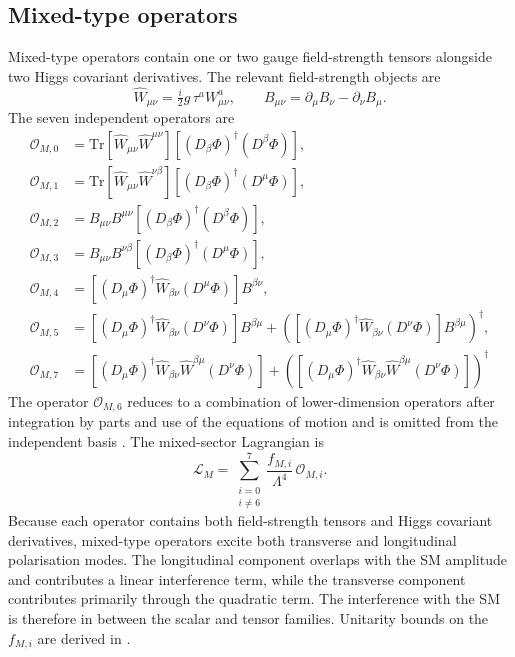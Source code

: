 \subsection{Mixed-type operators}

Mixed-type operators contain one or two gauge field-strength tensors alongside two Higgs covariant derivatives. The relevant field-strength objects are
\begin{equation}
\hat{W}_{\mu\nu} = \tfrac{i}{2}g\,\tau^{a}W_{\mu\nu}^{a}, \qquad B_{\mu\nu} = \partial_{\mu}B_{\nu}-\partial_{\nu}B_{\mu}.
\end{equation}
The seven independent operators are \cite{Eboli_2016}
\begin{align}
\mathcal{O}_{M,0} &= \mathrm{Tr}\!\left[\hat{W}_{\mu\nu}\hat{W}^{\mu\nu}\right] \left[(D_{\beta}\Phi)^{\dagger}(D^{\beta}\Phi)\right], \\[3pt] \mathcal{O}_{M,1} &= \mathrm{Tr}\!\left[\hat{W}_{\mu\nu}\hat{W}^{\nu\beta}\right] \left[(D_{\beta}\Phi)^{\dagger}(D^{\mu}\Phi)\right], \\[3pt] \mathcal{O}_{M,2} &= B_{\mu\nu}B^{\mu\nu} \left[(D_{\beta}\Phi)^{\dagger}(D^{\beta}\Phi)\right], \\[3pt] \mathcal{O}_{M,3} &= B_{\mu\nu}B^{\nu\beta} \left[(D_{\beta}\Phi)^{\dagger}(D^{\mu}\Phi)\right], \\[3pt] \mathcal{O}_{M,4} &= \left[(D_{\mu}\Phi)^{\dagger}\hat{W}_{\beta\nu}(D^{\mu}\Phi)\right]B^{\beta\nu}, \\[3pt] \mathcal{O}_{M,5} &= \left[(D_{\mu}\Phi)^{\dagger}\hat{W}_{\beta\nu}(D^{\nu}\Phi)\right]B^{\beta\mu} + \left(\left[(D_{\mu}\Phi)^{\dagger}\hat{W}_{\beta\nu}(D^{\nu}\Phi)\right]B^{\beta\mu}\right)^{\dagger}, \\[3pt] \mathcal{O}_{M,7} &= \left[(D_{\mu}\Phi)^{\dagger}\hat{W}_{\beta\nu}\hat{W}^{\beta\mu}(D^{\nu}\Phi)\right] + \left(\left[(D_{\mu}\Phi)^{\dagger}\hat{W}_{\beta\nu}\hat{W}^{\beta\mu}(D^{\nu}\Phi)\right]\right)^{\dagger}
\end{align}
The operator $\mathcal{O}_{M,6}$ reduces to a combination of lower-dimension operators after integration by parts and use of the equations of motion and is omitted from the independent basis \cite{Eboli_2016}. The mixed-sector Lagrangian is
\begin{equation}
\mathcal{L}_{M} = \sum_{\substack{i=0\\i\neq 6}}^{7} \frac{f_{M,i}}{\Lambda^{4}}\,\mathcal{O}_{M,i}.
\end{equation}
Because each operator contains both field-strength tensors and Higgs covariant derivatives, mixed-type operators excite both transverse and longitudinal polarisation modes. The longitudinal component overlaps with the SM amplitude and contributes a linear interference term, while the transverse component contributes primarily through the quadratic term. The interference with the SM is therefore in between the scalar and tensor families. Unitarity bounds on the $f_{M,i}$ are derived in \cite{PhysRevD.101.113003}.

